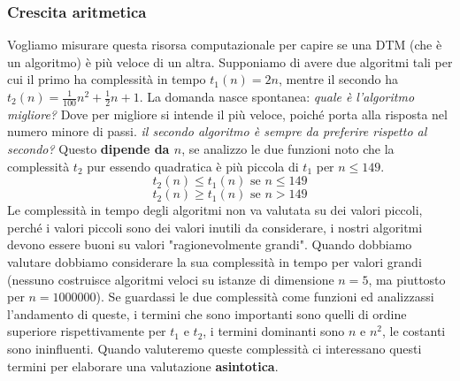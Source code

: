 \documentclass{article}
\begin{document}
\subsubsection{Crescita aritmetica}
Vogliamo misurare questa risorsa computazionale per capire se una DTM (che è un algoritmo)
è più veloce di un altra. Supponiamo di avere due algoritmi tali per cui il primo ha
complessità in tempo $t_1(n)=2n$, mentre il secondo ha $t_2(n)=\frac{1}{100}n^2+\frac{1}{2}n+1$.
La domanda nasce spontanea: \textit{quale è l'algoritmo migliore?} Dove per migliore si intende
il più veloce, poiché porta alla risposta nel numero minore di passi.
\textit{il secondo algoritmo è sempre da preferire rispetto al secondo?} Questo
\textbf{dipende da $n$},
se analizzo le due funzioni noto che la complessità $t_2$ pur essendo quadratica è più
piccola di $t_1$ per $n\leq 149$.
$$t_2(n)\leq t_1(n)\text{ se }n\leq 149$$
$$t_2(n)\geq t_1(n)\text{ se }n>149$$
Le complessità in tempo degli algoritmi non va valutata su dei valori piccoli, perché i valori
piccoli sono dei valori inutili da considerare, i nostri algoritmi devono essere buoni su valori
"ragionevolmente grandi". Quando dobbiamo valutare dobbiamo considerare la sua complessità
in tempo per valori grandi (nessuno costruisce algoritmi veloci su istanze di dimensione $n=5$,
ma piuttosto per $n=1000000$).
\newline\newline
Se guardassi le due complessità come funzioni ed analizzassi l'andamento di queste, i termini
che sono importanti sono quelli di ordine superiore rispettivamente per $t_1$ e $t_2$,
i termini dominanti sono $n$ e $n^2$, le costanti sono ininfluenti. Quando valuteremo
queste complessità ci interessano questi termini per elaborare una valutazione \textbf{asintotica}.
\pagebreak
\end{document}
